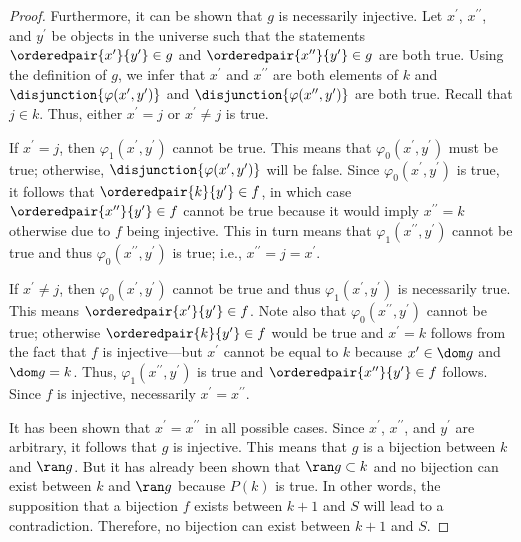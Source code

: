 \begin{proof}
    \vspace{0.3cm}
    \noindent
    Furthermore, it can be shown that \( g \) is necessarily injective.
    Let \( x^{\prime} \), \( x^{\prime\prime} \), and \( y^{\prime} \) be
    objects in the universe such that the statements
    \( \orderedpair{x^{\prime}}{y^{\prime}} \in g \) and \( \orderedpair{x^{\prime\prime}}{y^{\prime}} \in g \)
    are both true.
    Using the definition of \( g \), we infer that \( x^{\prime} \) and \( x^{\prime\prime} \) are both elements of \( k \)
    and \( \disjunction{\varphi(x^{\prime}, y^{\prime})} \) and \( \disjunction{\varphi(x^{\prime\prime}, y^{\prime})} \)
    are both true.
    Recall that \( j \in k \). Thus, either \( x^{\prime} = j \) or \( x^{\prime} \neq j \) is true.

    \vspace{0.3cm}
    \noindent
    If \( x^{\prime} = j \), then \( \varphi_{1}(x^{\prime}, y^{\prime}) \) cannot be true.
    This means that \( \varphi_{0}(x^{\prime}, y^{\prime}) \) must be true; otherwise, \( \disjunction{\varphi(x^{\prime}, y^{\prime})} \)
    will be false.
    Since \( \varphi_{0}(x^{\prime}, y^{\prime}) \) is true, it follows that \( \orderedpair{k}{y^{\prime}} \in f \),
    in which case \( \orderedpair{x^{\prime\prime}}{y^{\prime}} \in f \) cannot be true because it would imply \( x^{\prime\prime} = k \) otherwise
    due to \( f \) being injective.
    This in turn means that \( \varphi_{1}(x^{\prime\prime}, y^{\prime}) \) cannot be true and thus \( \varphi_{0}(x^{\prime\prime}, y^{\prime}) \)
    is true; i.e., \( x^{\prime\prime} = j = x^{\prime} \).

    \vspace{0.3cm}
    \noindent
    If \( x^{\prime} \neq j \), then \( \varphi_{0}(x^{\prime}, y^{\prime}) \) cannot be true and thus
    \( \varphi_{1}(x^{\prime}, y^{\prime}) \) is necessarily true.
    This means \( \orderedpair{x^{\prime}}{y^{\prime}} \in f \).
    Note also that \( \varphi_{0}(x^{\prime\prime}, y^{\prime}) \) cannot be true; otherwise
    \( \orderedpair{k}{y^{\prime}} \in f \) would be true and \( x^{\prime} = k \) follows from
    the fact that \( f \) is injective---but \( x^{\prime} \) cannot be equal to \( k \) because \( x^{\prime} \in \dom g \) and \( \dom g = k \).
    Thus, \( \varphi_{1}(x^{\prime\prime}, y^{\prime}) \) is true and \( \orderedpair{x^{\prime\prime}}{y^{\prime}} \in f \) follows.
    Since \( f \) is injective, necessarily \( x^{\prime} = x^{\prime\prime} \).

    \vspace{0.3cm}
    \noindent
    It has been shown that \( x^{\prime} = x^{\prime\prime} \) in all possible cases.
    Since \( x^{\prime} \), \( x^{\prime\prime} \), and \( y^{\prime} \) are arbitrary, it follows that \( g \)
    is injective.
    This means that \( g \) is a bijection between \( k \) and \( \ran g \).
    But it has already been shown that \( \ran g \subset k \) and no bijection can exist between \( k \) and \( \ran g \)
    because \( P(k) \) is true.
    In other words, the supposition that a bijection \( f \) exists between \( k + 1 \) and \( S \) will lead to a contradiction.
    Therefore, no bijection can exist between \( k + 1 \) and \( S \).


\end{proof}
